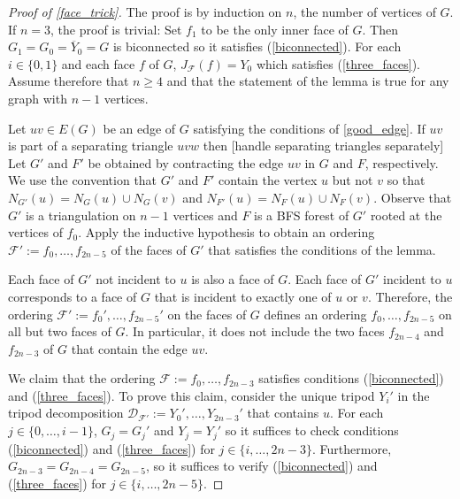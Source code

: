 \documentclass{patmorin}
\begin{document}

\begin{proof}[Proof of \cref{face_trick}]
  The proof is by induction on $n$, the number of vertices of $G$.  If $n=3$, the proof is trivial: Set $f_1$ to be the only inner face of $G$.  Then $G_1=G_0=\overline{Y}_0=G$ is biconnected so it satisfies (\ref{biconnected}).  For each $i\in\{0,1\}$ and each face $f$ of $G$, $J_{\mathcal{F}}(f)=Y_0$ which satisfies (\ref{three_faces}).  Assume therefore that $n\ge 4$ and that the statement of the lemma is true for any graph with $n-1$ vertices.

  Let $uv\in E(G)$ be an edge of $G$ satisfying the conditions of \cref{good_edge}.  If $uv$ is part of a separating triangle $uvw$ then [handle separating triangles separately] Let $G'$ and $F'$ be obtained by contracting the edge $uv$ in $G$ and $F$, respectively. We use the convention that $G'$ and $F'$ contain the vertex $u$ but not $v$ so that $N_{G'}(u)=N_G(u)\cup N_G(v)$ and $N_{F'}(u)=N_F(u)\cup N_F(v)$.  Observe that $G'$ is a triangulation on $n-1$ vertices and $F$ is a BFS forest of $G'$ rooted at the vertices of $f_0$.   Apply the inductive hypothesis to obtain an ordering $\mathcal{F}':=f_0,\ldots,f_{2n-5}$ of the faces of $G'$ that satisfies the conditions of the lemma.

  Each face of $G'$ not incident to $u$ is also a face of $G$.  Each face of $G'$ incident to $u$ corresponds to a face of $G$ that is incident to exactly one of $u$ or $v$.
  Therefore, the ordering $\mathcal{F}':=f_0',\ldots,f_{2n-5}'$ on the faces of $G$ defines an ordering $f_0,\ldots,f_{2n-5}$ on all but two faces of $G$.  In particular, it does not include the two faces $f_{2n-4}$ and $f_{2n-3}$ of $G$ that contain the edge $uv$.

  We claim that the ordering $\mathcal{F}:=f_0,\ldots,f_{2n-3}$ satisfies conditions (\ref{biconnected}) and (\ref{three_faces}). To prove this claim, consider the unique tripod $Y_i'$ in the tripod decomposition $\mathcal{D}_{\mathcal{F'}}:=Y_0',\ldots,Y_{2n-3}'$ that contains $u$. For each $j\in\{0,\ldots,i-1\}$, $G_j=G_j'$ and $Y_j=Y_j'$ so it suffices to check conditions (\ref{biconnected}) and (\ref{three_faces}) for $j\in\{i,\ldots,2n-3\}$. Furthermore, $G_{2n-3}=G_{2n-4}=G_{2n-5}$, so it suffices to verify (\ref{biconnected}) and (\ref{three_faces}) for $j\in\{i,\ldots,2n-5\}$.



\end{proof}
\end{document}
